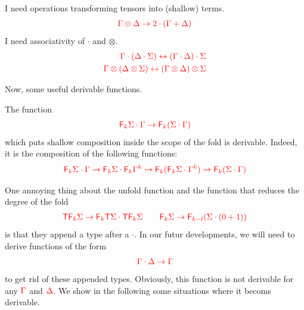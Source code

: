 I need operations transforming tensors into (shallow) terms.
\begin{align*}
{\color{red}{\Gamma\otimes \Delta \to 2\cdot(\Gamma+\Delta)}}
\end{align*}
I need associativity of $\cdot$ and $\otimes$.
\begin{align*}
{\color{red}{\Gamma\cdot(\Delta\cdot\Sigma) \leftrightarrow (\Gamma\cdot\Delta)\cdot\Sigma}}\\
{\color{red}{\Gamma\otimes(\Delta\otimes\Sigma) \leftrightarrow (\Gamma\otimes\Delta)\otimes\Sigma}}
\end{align*}

Now, some useful derivable functions.
\begin{example}\label{ex:PermuteScopeShallowFold}
The function
\begin{align*}
{\color{red}{{\color{red}{\mathsf F_{k}}}\Sigma\cdot \Gamma\to {\color{red}{\mathsf F_{k}}}(\Sigma\cdot \Gamma)}}
\end{align*}
which puts shallow composition inside the scope of the fold is derivable. Indeed, it is the composition of the following functions:
\begin{align*}
{\color{red}{{\color{red}{\mathsf F_{k}}}\Sigma\cdot \Gamma\to {\color{red}{\mathsf F_{k}}}\Sigma\cdot {\color{red}{\mathsf F_{k}}}\Gamma^k\to {\color{red}{\mathsf F_{k}}}({\color{red}{\mathsf F_{k}}}\Sigma\cdot \Gamma^k)\to {\color{red}{\mathsf F_{k}}}(\Sigma\cdot \Gamma)}}
\end{align*} 
\end{example}

One annoying thing about the unfold function and the function that reduces the degree of the fold
\begin{align*}
{\color{red}{{\color{red}{\mathsf T}}{\color{red}{\mathsf F_{k}}}\Sigma \to {\color{red}{\mathsf F_{k}}}{\color{red}{\mathsf T}}\Sigma\cdot  {\color{red}{\mathsf T}}{\color{red}{\mathsf F_{k}}}\Sigma \qquad {\color{red}{\mathsf F_{k}}}\Sigma \to {\color{red}{\mathsf F_{k-l}}}(\Sigma\cdot(0+1))}}
 \end{align*}
 is that they append a type after a $\cdot$. In our futur developments, we will need to derive functions of the form
 \begin{align*}
 {\color{red}{\Gamma\cdot\Delta\to \Gamma}}
 \end{align*}
 to get rid of these appended types. Obviously, this function is not derivable for any ${\color{red}{\Gamma}}$ and ${\color{red}{\Delta}}$. We show in the following some situations where it becoms derivable.
 
